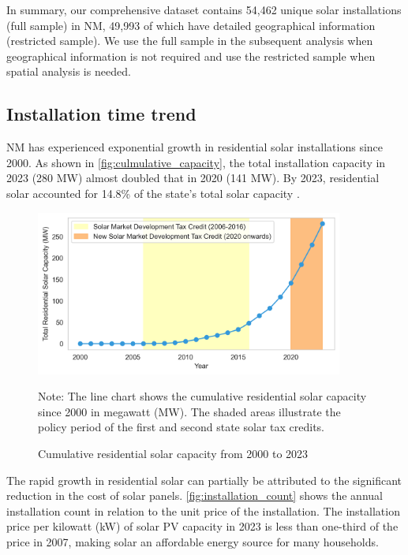 \documentclass[12pt,twoside,letterpaper]{article}
\begin{document}
In summary, our comprehensive dataset contains 54,462 unique solar installations (full sample) in NM, 49,993 of which have detailed geographical information (restricted sample). We use the full sample in the subsequent analysis when geographical information is not required and use the restricted sample when spatial analysis is needed.

\subsection{Installation time trend}
 
NM has experienced exponential growth in residential solar installations since 2000. As shown in \autoref{fig:culmulative_capacity}, the total installation capacity in 2023 (280 MW) almost doubled that in 2020 (141 MW). By 2023, residential solar accounted for 14.8\% of the state’s total solar capacity \parencite{seia2023nm}.

\begin{figure}[!ht]
    \centering
\includegraphics[width=0.9\textwidth]{figures/cumulative_capacity.png}
    \caption{Cumulative residential solar capacity from 2000 to 2023}
    \label{fig:culmulative_capacity}
    \begin{flushleft}
        \footnotesize Note: The line chart shows the cumulative residential solar capacity since 2000 in megawatt (MW). The shaded areas illustrate the policy period of the first and second state solar tax credits.  
    \end{flushleft}
    
\end{figure}


The rapid growth in residential solar can partially be attributed to the significant reduction in the cost of solar panels. \autoref{fig:installation_count} shows the annual installation count in relation to the unit price of the installation. The installation price per kilowatt (kW) of solar PV capacity in 2023 is less than one-third of the price in 2007, making solar an affordable energy source for many households.
\end{document}
